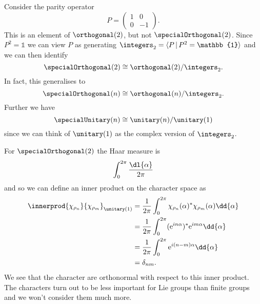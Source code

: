 \documentclass[fleqn]{NotesClass}
\newcommand*{\isomorphic}{\cong}
\newcommand*{\ident}{\mathbb{1}}
\newcommand*{\e}{\mathrm{e}}
\begin{document}
    Consider the parity operator
    \begin{equation}
        P = 
        \begin{pmatrix}
            1 & 0\\
            0 & -1
        \end{pmatrix}
        .
    \end{equation}
    This is an element of \(\orthogonal(2)\), but not \(\specialOrthogonal(2)\).
    Since \(P^2 = \ident\) we can view \(P\) as generating \(\integers_2 = \presentation{P}{P^2 = \ident}\) and we can then identify
    \begin{equation}
        \specialOrthogonal(2) \isomorphic \orthogonal(2) / \integers_2.
    \end{equation}
    In fact, this generalises to
    \begin{equation}
        \specialOrthogonal(n) \isomorphic \orthogonal(n) / \integers_2.
    \end{equation}
    Further we have
    \begin{equation}
        \specialUnitary(n) \isomorphic \unitary(n) / \unitary(1)
    \end{equation}
    since we can think of \(\unitary(1)\) as the complex version of \(\integers_2\).
    
    For \(\specialOrthogonal(2)\) the Haar measure is
    \begin{equation}
        \int_0^{2\pi} \frac{\dl{\alpha}}{2\pi}
    \end{equation}
    and so we can define an inner product on the character space as
    \begin{align}
        \innerprod{\chi_{\rho_n}}{\chi_{\rho_m}}_{\unitary(1)} &= \frac{1}{2\pi}\int_{0}^{2\pi} \chi_{\rho_n}(\alpha)^* \chi_{\rho_m}(\alpha) \dd{\alpha}\\
        &= \frac{1}{2\pi} \int_{0}^{2\pi} (\e^{in\alpha})^*\e^{im\alpha} \dd{\alpha}\\
        &= \frac{1}{2\pi} \int_{0}^{2\pi} \e^{i(n - m)\alpha} \dd{\alpha}\\
        &= \delta_{nm}.
    \end{align}
    We see that the character are orthonormal with respect to this inner product.
    The characters turn out to be less important for Lie groups than finite groups and we won't consider them much more.
    
\end{document}
